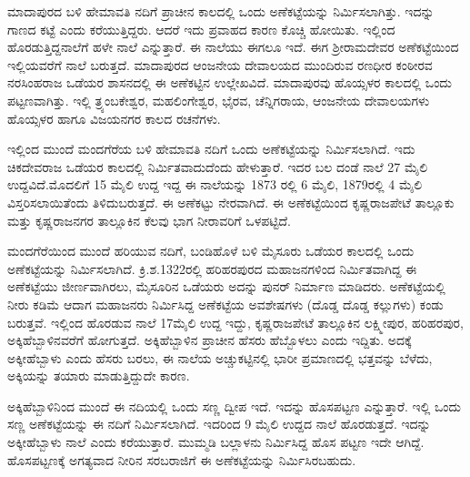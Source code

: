 ಮಾದಾಪುರದ ಬಳಿ ಹೇಮಾವತಿ ನದಿಗೆ ಪ್ರಾಚೀನ ಕಾಲದಲ್ಲಿ ಒಂದು ಅಣೆಕಟ್ಟೆಯನ್ನು ನಿರ್ಮಿಸಲಾಗಿತ್ತು. ಇದನ್ನು ಗಾಣದ ಕಟ್ಟೆ ಎಂದು ಕರೆಯುತ್ತಿದ್ದರು. ಆದರೆ ಇದು ಪ್ರವಾಹದ ಕಾರಣ ಕೊಚ್ಚಿ ಹೋಯಿತು. ಇಲ್ಲಿಂದ ಹೊರಡುತ್ತಿದ್ದ\break ನಾಲೆಗೆ ಹಳೇ ನಾಲೆ ಎನ್ನುತ್ತಾರೆ. ಈ ನಾಲೆಯು ಈಗಲೂ ಇದೆ. ಈಗ ಶ‍್ರೀರಾಮದೇವರ ಅಣೆಕಟ್ಟೆಯಿಂದ ಇಲ್ಲಿಯ\-ವರೆಗೆ ನಾಲೆ ಬರುತ್ತದೆ. ಮಾದಾಪುರದ ಆಂಜನೇಯ ದೇವಾಲಯದ ಮುಂದಿರುವ ರಣಧೀರ ಕಂಠೀರವ ನರಸಿಂಹರಾಜ ಒಡೆಯರ ಶಾಸನದಲ್ಲಿ ಈ ಅಣೆಕಟ್ಟಿನ ಉಲ್ಲೇಖವಿದೆ. ಮಾದಾಪುರವು ಹೊಯ್ಸಳರ ಕಾಲದಲ್ಲಿ ಒಂದು ಪಟ್ಟಣವಾಗಿತ್ತು. ಇಲ್ಲಿ \hbox{ತ್ರ್ಯಂಬಕೇಶ್ವರ}, ಮಹಲಿಂಗೇಶ್ವರ, ಭೈರವ, ಚೆನ್ನಿಗರಾಯ, ಆಂಜನೇಯ ದೇವಾಲಯಗಳು ಹೊಯ್ಸಳರ ಹಾಗೂ ವಿಜಯನಗರ ಕಾಲದ ರಚನೆಗಳು.

ಇಲ್ಲಿಂದ ಮುಂದೆ ಮಂದಗೆರೆಯ ಬಳಿ ಹೇಮಾವತಿ ನದಿಗೆ ಒಂದು ಅಣೆಕಟ್ಟೆಯನ್ನು ನಿರ್ಮಿಸಲಾಗಿದೆ. ಇದು ಚಿಕದೇವರಾಜ ಒಡೆಯರ ಕಾಲದಲ್ಲಿ ನಿರ್ಮಿತವಾದುದೆಂದು ಹೇಳುತ್ತಾರೆ. ಇದರ ಬಲ ದಂಡೆ ನಾಲೆ 27 ಮೈಲಿ ಉದ್ದವಿದೆ.\break ಮೊದಲಿಗೆ 15 ಮೈಲಿ ಉದ್ದ ಇದ್ದ ಈ ನಾಲೆಯನ್ನು 1873 ರಲ್ಲಿ 6 ಮೈಲಿ, 1879ರಲ್ಲಿ 4 ಮೈಲಿ ವಿಸ್ತರಿಸಲಾಯಿತೆಂದು ತಿಳಿದುಬರುತ್ತದೆ. ಈ ಅಣೆಕಟ್ಟು ನೇರವಾಗಿದೆ. ಈ ಅಣೆಕಟ್ಟೆಯಿಂದ ಕೃಷ್ಣರಾಜಪೇಟೆ ತಾಲ್ಲೂಕು ಮತ್ತು ಕೃಷ್ಣರಾಜನಗರ ತಾಲ್ಲೂಕಿನ ಕೆಲವು ಭಾಗ ನೀರಾವರಿಗೆ ಒಳಪಟ್ಟಿದೆ.

ಮಂದಗೆರೆಯಿಂದ ಮುಂದೆ ಹರಿಯುವ ನದಿಗೆ, ಬಂಡಿಹೊಳೆ ಬಳಿ ಮೈಸೂರು ಒಡೆಯರ ಕಾಲದಲ್ಲಿ ಒಂದು ಅಣೆಕಟ್ಟೆಯನ್ನು ನಿರ್ಮಿಸಲಾಗಿದೆ. ಕ್ರಿ.ಶ.1322ರಲ್ಲಿ ಹರಿಹರಪುರದ ಮಹಾಜನಗಳಿಂದ ನಿರ್ಮಿತವಾಗಿದ್ದ ಈ ಅಣೆಕಟ್ಟೆಯು ಜೀರ್ಣವಾಗಿರಲು, ಮೈಸೂರಿನ ಒಡೆಯರು ಅದನ್ನು ಪುನರ್​ ನಿರ್ಮಾಣ ಮಾಡಿದರು. ಅಣೆಕಟ್ಟೆಯಲ್ಲಿ ನೀರು ಕಡಿಮೆ ಆದಾಗ ಮಹಾಜನರು ನಿರ್ಮಿಸಿದ್ದ ಅಣೆಕಟ್ಟೆಯ ಅವಶೇಷಗಳು (ದೊಡ್ಡ ದೊಡ್ಡ ಕಲ್ಲುಗಳು) ಕಂಡು ಬರುತ್ತವೆ. ಇಲ್ಲಿಂದ ಹೊರಡುವ ನಾಲೆ 17ಮೈಲಿ ಉದ್ದ ಇದ್ದು, ಕೃಷ್ಣರಾಜಪೇಟೆ ತಾಲ್ಲೂಕಿನ ಲಕ್ಷ್ಮೀಪುರ, ಹರಿಹರಪುರ, ಅಕ್ಕಿಹೆಬ್ಬಾಳಿನವರೆಗೆ ಹೋಗುತ್ತದೆ. ಅಕ್ಕಿಹೆಬ್ಬಾಳಿನ ಪ್ರಾಚೀನ ಹೆಸರು ಹೆಬ್ಬೊಳಲು ಎಂದು ಇದ್ದಿತು. ಅದಕ್ಕೆ ಅಕ್ಕೀಹೆಬ್ಬಾಳು ಎಂದು ಹೆಸರು ಬರಲು, ಈ ನಾಲೆಯ ಅಚ್ಚುಕಟ್ಟಿನಲ್ಲಿ ಭಾರೀ ಪ್ರಮಾಣದಲ್ಲಿ ಭತ್ತವನ್ನು ಬೆಳೆದು, ಅಕ್ಕಿಯನ್ನು ತಯಾರು ಮಾಡುತ್ತಿದ್ದುದೇ ಕಾರಣ.

ಅಕ್ಕಿಹೆಬ್ಬಾಳಿನಿಂದ ಮುಂದೆ ಈ ನದಿಯಲ್ಲಿ ಒಂದು ಸಣ್ಣ ದ್ವೀಪ ಇದೆ. ಇದನ್ನು ಹೊಸಪಟ್ಟಣ ಎನ್ನುತ್ತಾರೆ. ಇಲ್ಲಿ ಒಂದು ಸಣ್ಣ ಅಣೆಕಟ್ಟೆಯನ್ನು ಈ ನದಿಗೆ ನಿರ್ಮಿಸಲಾಗಿದೆ. ಇದರಿಂದ 9 ಮೈಲಿ ಉದ್ದದ ನಾಲೆ ಹೊರಡುತ್ತದೆ. ಇದನ್ನು ಅಕ್ಕೀಹೆಬ್ಬಾಳು ನಾಲೆ ಎಂದು ಕರೆಯುತ್ತಾರೆ. ಮುಮ್ಮಡಿ ಬಲ್ಲಾಳನು ನಿರ್ಮಿಸಿದ್ದ ಹೊಸ ಪಟ್ಟಣ ಇದೇ ಆಗಿದ್ದೆ. ಹೊಸಪಟ್ಟಣಕ್ಕೆ ಅಗತ್ಯವಾದ ನೀರಿನ ಸರಬರಾಜಿಗೆ ಈ ಅಣೆಕಟ್ಟೆಯನ್ನು ನಿರ್ಮಿಸಿರಬಹುದು.

